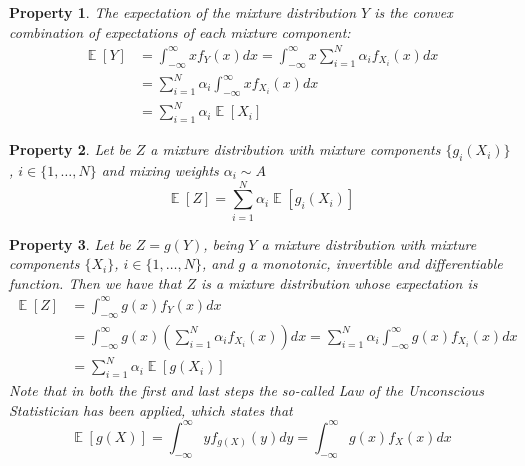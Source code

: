 \documentclass[12pt,a4paper,openright,twoside]{article}
\DeclareMathOperator*{\E}{\mathbb{E}}
\numberwithin{equation}{section}
\theoremstyle{definition}
\theoremstyle{remark}
\theoremstyle{plain}
\newtheorem{mixtureProperty}{Property}
\begin{document}
\begin{mixtureProperty} \label{mixtureProperty1}
	The expectation of the mixture distribution $Y$ is the convex combination of expectations of each mixture component: 
    \begin{equation} \label{mixtureProperty1eq}
    \begin{split}
        \E [Y] &= \int_{-\infty}^{\infty} x f_{Y}(x) dx = \int_{-\infty}^{\infty} x \sum_{i=1}^{N} \alpha_i f_{X_i}(x) dx \\
        &= \sum_{i=1}^{N} \alpha_i \int_{-\infty}^{\infty} x f_{X_i}(x) dx \\
        &= \sum_{i=1}^{N} \alpha_i \E [X_i]
    \end{split}
    \end{equation}
\end{mixtureProperty}


\begin{mixtureProperty} \label{mixtureProperty2}
	Let be $Z$ a mixture distribution with mixture components $\{g_i(X_i)\}$, $i\in \{1, \dots, N\}$ and mixing weights $\alpha_i \sim A$
    \begin{equation} \label{mixtureProperty2eq}
        \E [Z] = \sum_{i=1}^{N} \alpha_i \E [g_i(X_i)]
    \end{equation}
\end{mixtureProperty}


\begin{mixtureProperty} \label{mixtureProperty3}
	Let be $Z=g(Y)$, being $Y$ a mixture distribution with mixture components $\{X_i\}$, $i\in \{1, \dots, N\}$, and $g$ a monotonic, invertible and differentiable function. Then we have that $Z$ is a mixture distribution whose expectation is
    \begin{equation} \label{mixtureProperty3eq}
        \begin{split}
        \E [Z] &= \int_{-\infty}^{\infty} g(x) f_{Y}(x) dx \\
        &= \int_{-\infty}^{\infty} g(x) \left( \sum_{i=1}^{N} \alpha_i f_{X_i}(x)\right) dx = \sum_{i=1}^{N} \alpha_i \int_{-\infty}^{\infty} g(x) f_{X_i}(x) dx \\
        &= \sum_{i=1}^{N} \alpha_i \E [g(X_i)]
        \end{split}
    \end{equation}
    Note that in both the first and last steps the so-called Law of the Unconscious Statistician has been applied, which states that
    \begin{equation} \label{LOTUS}
    	\E [g(X)] = \int_{-\infty}^{\infty} y f_{g(X)}(y) dy  = \int_{-\infty}^{\infty} g(x) f_{X}(x) dx
    \end{equation}

\end{mixtureProperty}
\end{document}
